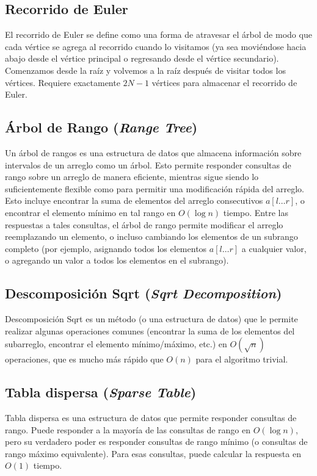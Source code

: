 \subsection{Recorrido de Euler}
El recorrido de Euler se define como una forma de atravesar el árbol de modo que cada vértice se agrega al recorrido cuando lo visitamos (ya sea moviéndose hacia abajo desde el vértice principal o regresando desde el vértice secundario). Comenzamos desde la raíz y volvemos a la raíz después de visitar todos los vértices. Requiere exactamente $2N-1$ vértices para almacenar el recorrido de Euler.

\subsection{Árbol de Rango (\emph{Range Tree})}
Un árbol de rangos es una estructura de datos que almacena información sobre intervalos de un arreglo como 
un árbol. Esto permite responder consultas de rango sobre un arreglo de manera eficiente, mientras sigue 
siendo lo suficientemente flexible como para permitir una modificación rápida del arreglo. Esto incluye 
encontrar la suma de elementos del arreglo consecutivos $a[l \dots r]$, o encontrar el elemento mínimo en 
tal rango en $O(\log n)$ tiempo. Entre las respuestas a tales consultas, el árbol de rango permite 
modificar el arreglo reemplazando un elemento, o incluso cambiando los elementos de un subrango completo 
(por ejemplo, asignando todos los elementos $a[l \dots r]$ a cualquier valor, o agregando un valor a todos 
los elementos en el subrango).

\subsection{Descomposición Sqrt (\emph{Sqrt Decomposition})}

Descomposición Sqrt es un método (o una estructura de datos) que le permite realizar algunas operaciones comunes (encontrar la suma de los elementos del subarreglo, encontrar el elemento mínimo/máximo, etc.) en $O(\sqrt n)$ operaciones, que es mucho más rápido que $O(n)$ para el algoritmo trivial.

\subsection{Tabla dispersa (\emph{Sparse Table})}

Tabla dispersa es una estructura de datos que permite responder consultas de rango. Puede responder a la mayoría de las consultas de rango en $O(\log n)$, pero su verdadero poder es responder consultas de rango mínimo (o consultas de rango máximo equivalente). Para esas consultas, puede calcular la respuesta en $O(1)$ tiempo.

